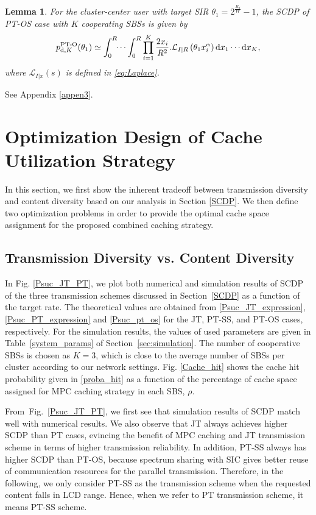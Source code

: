 \documentclass[twocolumns,10pt]{IEEEtran}
\newtheorem{lemma}{Lemma}
\begin{document}
\begin{lemma}
	\label{lemma3}
	For the cluster-center user with target SIR $\theta_1=2^{\frac{R_d}{W}}-1$,
	the SCDP of PT-OS case with $K$ cooperating SBSs is given by 
\begin{equation}
	p_{\textnormal{d},K}^{\textnormal{PT-O}} (\theta_1)  
	\simeq  
	 \int_{0}^{R}\!\!\cdots\int_{0}^{R}  \prod\limits_{i=1}^{K} \frac{2 x_i}{R^2}.  \mathcal{L}_{I|R}\left(\theta_1 x_i^{\alpha}\right)\textnormal{d}x_1 \cdots \textnormal{d}x_K,
	\label{Psuc_pt_os}
	\end{equation}  	
	where $\mathcal{L}_{I|x}(s)$ is defined in \eqref{eq:Laplace}. 
\end{lemma}
\begin{IEEEproof}
	\textnormal{See Appendix \ref{appen3}.}
\end{IEEEproof}


\section{Optimization Design of Cache Utilization Strategy}
\label{optimal caching}
In this section, we first show the inherent tradeoff between transmission diversity and content diversity based on our analysis in Section \ref{SCDP}. We then define two optimization problems in order to provide the optimal cache space assignment for the proposed combined caching strategy.

\subsection{Transmission Diversity vs. Content Diversity}	
\label{tradeoff}
In Fig. \ref{Psuc_JT_PT}, we plot both numerical and simulation results of SCDP of the three transmission schemes discussed in Section~\ref{SCDP} as a function of the target rate. The theoretical values are obtained from \eqref{Psuc_JT_expression}, \eqref{Psuc_PT_expression} and \eqref{Psuc_pt_os} for the JT, PT-SS, and PT-OS cases, respectively. For the simulation results, the values of used parameters are given in Table~\ref{system_params} of Section~\ref{sec:simulation}. The number of cooperative SBSs is chosen as $K=3$, which is close to the average number of SBSs per cluster according to our network settings. 
Fig. \ref{Cache_hit} shows the cache hit probability given in \eqref{proba_hit} as a function of the percentage of cache space assigned for MPC caching strategy in each SBS, $\rho$. 


From~Fig.~\ref{Psuc_JT_PT}, we first see that simulation results of SCDP match well with numerical results.
We also observe that JT always achieves higher SCDP than PT cases, evincing the benefit of MPC caching and JT transmission scheme in terms of higher transmission reliability.
In addition, PT-SS always has higher SCDP than PT-OS, because spectrum sharing with SIC gives better reuse of communication resources for the parallel transmission. Therefore, in the following, we only consider PT-SS as the transmission scheme when the requested content falls in LCD range. 
Hence, when we refer to PT transmission scheme, it means PT-SS scheme.  
\end{document}
